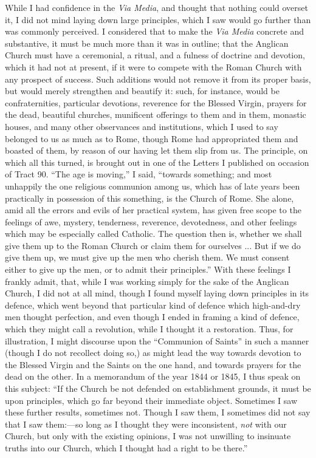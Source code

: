 While I had confidence in the \emph{Via Media}, and thought that
nothing could overset it, I did not mind laying down large principles,
which I saw would go further than was commonly perceived. I considered
that to make the \emph{Via Media} concrete and substantive, it must be
much more than it was in outline; that the Anglican Church must have a
ceremonial, a ritual, and a fulness of doctrine and devotion, which it
had not at present, if it were to compete with the Roman Church with any
prospect of success. Such additions would not remove it from its proper
basis, but would merely strengthen and beautify it: such, for instance,
would be confraternities, particular devotions, reverence for the
Blessed Virgin, prayers for the dead, beautiful churches, munificent offerings to them and in them, monastic houses, and many other
observances and institutions, which I used to say belonged to us as much
as to Rome, though Rome had appropriated them and boasted of them, by
reason of our having let them slip from us. The principle, on which all
this turned, is brought out in one of the Letters I published on
occasion of Tract 90. ``The age is moving,'' I said,
``towards something; and most unhappily the one religious communion
among us, which has of late years been practically in possession of this
something, is the Church of Rome. She alone, amid all the errors and
evils of her practical system, has given free scope to the feelings of
awe, mystery, tenderness, reverence, devotedness, and other feelings
which may be especially called Catholic. The question then is, whether
we shall give them up to the Roman Church or claim them for
ourselves ... But if we do give them up, we must give up the men who
cherish them. We must consent either to give up the men, or to admit
their principles.'' With these feelings I frankly admit, that, while
I was working simply for the sake of the Anglican Church, I did not at
all mind, though I found myself laying down principles in its defence,
which went beyond that particular kind of defence which
high-and-dry men thought perfection, and even though I ended in
framing a kind of defence, which they might call a revolution,
while I thought it a restoration. Thus, for illustration, I might
discourse upon the ``Communion of Saints'' in such a manner
(though I do not recollect doing so,) as might lead the way towards
devotion to the Blessed Virgin and the Saints on the one hand,
and towards prayers for the dead on the other. In a memorandum of the
year 1844 or 1845, I thus speak on this subject: ``If the Church be
not defended on establishment grounds, it must be upon principles, which
go far beyond their immediate object. Sometimes I saw these further
results, sometimes not. Though I saw them, I sometimes did not say that
I saw them:—so long as I thought they were inconsistent, \emph{not} with
our Church, but only with the existing opinions, I was not unwilling to
insinuate truths into our Church, which I thought had a right to be
there.''

